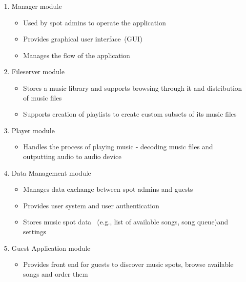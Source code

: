 \begin{enumerate}
    \item Manager module
        \begin{itemize}
            \item Used by spot admins to operate the application
            \item Provides graphical user interface~(GUI)
            \item Manages the flow of the application
        \end{itemize}
    \item Fileserver module
        \begin{itemize}
            \item Stores a music library and supports browsing through it and distribution of music files
            \item Supports creation of playlists to create custom subsets of its music files
        \end{itemize}
    \item Player module
        \begin{itemize}
            \item Handles the process of playing music - decoding music files and outputting audio to audio device
        \end{itemize}
    \item Data Management module
        \begin{itemize}
            \item Manages data exchange between spot admins and guests
            \item Provides user system and user authentication
            \item Stores music spot data ~(e.g., list of available songs, song queue)and settings
        \end{itemize}
    \item Guest Application module
        \begin{itemize}
            \item Provides front end for guests to discover music spots, browse available songs and order them
        \end{itemize}
\end{enumerate}

